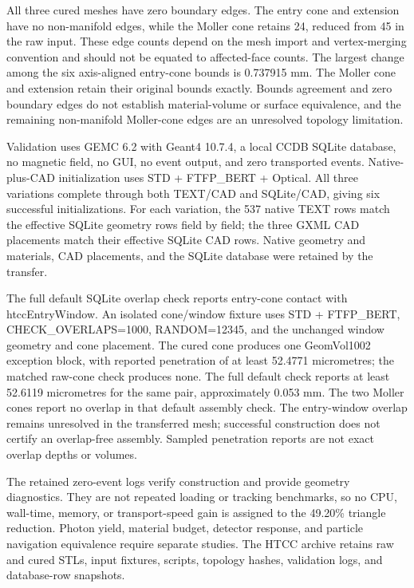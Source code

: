 All three cured meshes have zero boundary edges. The entry cone and extension have no non-manifold edges,
while the Moller cone retains 24, reduced from 45 in the raw input. These edge counts depend on the mesh
import and vertex-merging convention and should not be equated to affected-face counts. The largest change
among the six axis-aligned entry-cone bounds is 0.737915 mm. The Moller cone and extension retain their
original bounds exactly. Bounds agreement and zero boundary edges do not establish material-volume or surface
equivalence, and the remaining non-manifold Moller-cone edges are an unresolved topology limitation.

Validation uses GEMC 6.2 with Geant4 10.7.4, a local CCDB SQLite database, no magnetic field, no GUI, no event
output, and zero transported events. Native-plus-CAD initialization uses STD + FTFP\_BERT + Optical. All three
variations complete through both TEXT/CAD and SQLite/CAD, giving six successful initializations. For each
variation, the 537 native TEXT rows match the effective SQLite geometry rows field by field; the three GXML
CAD placements match their effective SQLite CAD rows. Native geometry and materials, CAD placements, and the
SQLite database were retained by the transfer.

The full default SQLite overlap check reports entry-cone contact with htccEntryWindow. An isolated cone/window
fixture uses STD + FTFP\_BERT, CHECK\_OVERLAPS=1000, RANDOM=12345, and the unchanged window geometry and cone
placement. The cured cone produces one GeomVol1002 exception block, with reported penetration of at least
52.4771 micrometres; the matched raw-cone check produces none. The full default check reports at least 52.6119
micrometres for the same pair, approximately 0.053 mm. The two Moller cones report no overlap in that default
assembly check. The entry-window overlap remains unresolved in the transferred mesh; successful construction
does not certify an overlap-free assembly. Sampled penetration reports are not exact overlap depths or
volumes.

The retained zero-event logs verify construction and provide geometry diagnostics. They are not repeated
loading or tracking benchmarks, so no CPU, wall-time, memory, or transport-speed gain is assigned to the
49.20\% triangle reduction. Photon yield, material budget, detector response, and particle navigation
equivalence require separate studies. The HTCC archive retains raw and cured STLs, input fixtures, scripts,
topology hashes, validation logs, and database-row snapshots.

